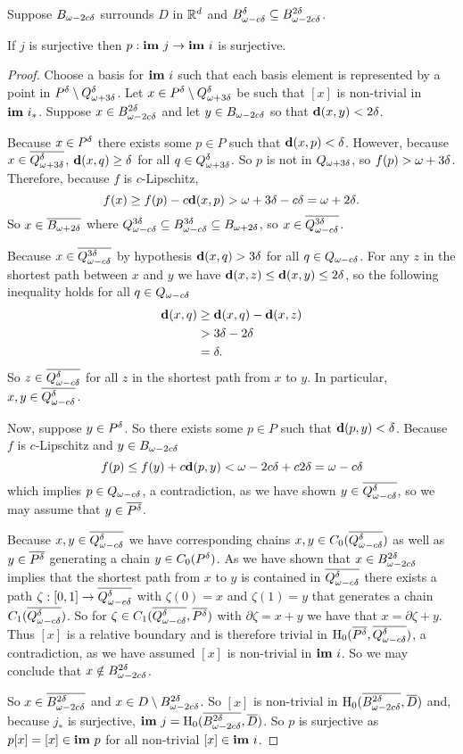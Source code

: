 \begin{lemma}\label{lem:psurj}
  Suppose $\b$ surrounds $D$ in $\R^d$ and $B_{\omega - c\delta}^\delta\subseteq \bb$.

  If $j$ is surjective then $p : \im~j\to\im~i$ is surjective.
\end{lemma}
\begin{proof}
  Choose a basis for $\im~i$ such that each basis element is represented by a point in $\P\setminus \QQ^\delta$.
  Let $x\in \P\setminus \QQ^\delta$ be such that $[x]$ is non-trivial in $\im~i_*$.
  Suppose $x\in\bb$ and let $y\in \b$ so that $\dist(x, y) < \off$.

  Because $x\in \P$ there exists some $p\in P$ such that $\dist(x, p) < \delta$.
  However, because $x\in\cmp{\QQ^\delta}$, $\dist(x, q) \geq \delta$ for all $q\in \QQ^\delta$.
  So $p$ is not in $\QQ$, so $f(p) > \ome + \offf$.
  Therefore, because $f$ is $c$-Lipschitz,
  \[ f(x)\geq f(p) - c\dist(x, p) > \ome + \offf - c\delta = \ome + \off.\]
  So $x\in \cmp{B_{\ome+\off}}$ where $\Q^\offf \subseteq B_{\fen}^\offf\subseteq B_{\ome+\off}$, so $x\in \cmp{\Q^\offf}$.

  Because $x\in\cmp{\Q^\offf}$ by hypothesis $\dist(x, q) > \offf$ for all $q\in \Q$.
  For any $z$ in the shortest path between $x$ and $y$ we have $\dist(x, z)\leq \dist(x, y)\leq \off$, so the following inequality holds for all $q\in \Q$
  \begin{align*}
    \dist(x, q) & \geq \dist(x, q) - \dist(x, z)\\
                & > \offf - \off\\
                & = \of.
  \end{align*}
  So $z\in \cmp{\Q^\delta}$ for all $z$ in the shortest path from $x$ to $y$.
  In particular, $x,y\in\cmp{\Q^\delta}$.

  Now, suppose $y\in \P$.
  So there exists some $p\in P$ such that $\dist(p, y) < \delta$.
  Because $f$ is $c$-Lipschitz and $y\in \b$
  \[ f(p)\leq f(y) + c\dist(p, y) < \o + c\off = \fen \]
  which implies $p\in \Q$, a contradiction, as we have shown $y\in\cmp{\Q^\delta}$, so we may assume that $y\in \cmp{\P}$.

  Because $x,y\in\cmp{\Q^\delta}$ we have corresponding chains $x,y\in C_0(\cmp{\Q^\delta})$ as well as $y\in\cmp{\P}$ generating a chain $y\in C_0(\P)$.
  As we have shown that $x\in \bb$ implies that the shortest path from $x$ to $y$ is contained in $\cmp{\Q^\delta}$ there exists a path $\zeta: [0,1]\to \cmp{\Q^\delta}$ with $\zeta(0) = x$ and $\zeta(1) = y$ that generates a chain $C_1(\cmp{\Q^\delta})$.
  So for $\zeta\in C_1(\cmp{\Q^\delta}, \cmp{\P})$ with $\partial \zeta = x + y$ we have that $x = \partial \zeta + y$.
  Thus $[x]$ is a relative boundary and is therefore trivial in $\hom_0(\cmp{\P}, \cmp{\Q^\delta})$, a contradiction, as we have assumed $[x]$ is non-trivial in $\im~i$.
  So we may conclude that $x\notin \bb$.

  So $x\in\cmp{\bb}$ and $x\in D\setminus\bb$.
  So $[x]$ is non-trivial in $\hom_0(\cmp{\bb},\cmp{D})$ and, because $j_*$ is surjective, $\im~j = \hom_0(\cmp{\bb},\cmp{D})$.
  So $p$ is surjective as $p[x] = [x]\in\im~p$ for all non-trivial $[x]\in\im~i$.
\end{proof}

